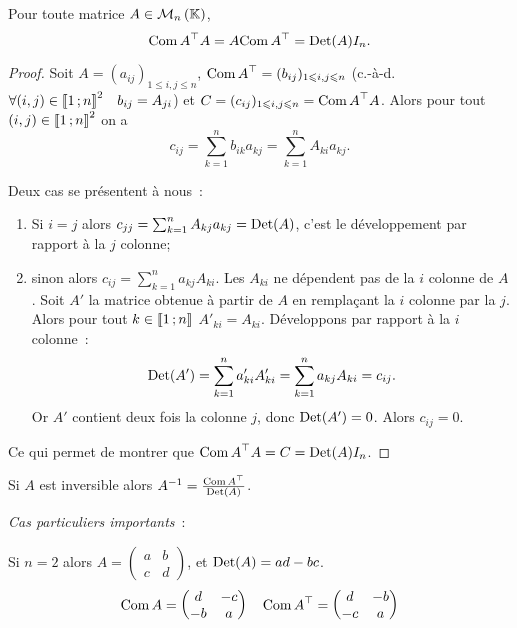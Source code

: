 \begin{prop}
  Pour toute matrice \(A \in \mathcal{M}_{n}\left(\mathbb{K}\right)\),
  \begin{equation}
    {\operatorname{Com}A}^{\top} A = A {\operatorname{Com} A}^{\top} = \operatorname{Det}(A) I_n.
  \end{equation}
\end{prop}
\begin{proof}
  Soit \(A=(a_{ij})_{1 \leqslant i,j \leqslant n}\), \({\operatorname{Com} A}^{\top} = (b_{ij})_{1 \leqslant i,j \leqslant n}\) (c.-à-d. \(\forall (i,j) \in \mathopen{\llbracket}1\mathclose{}\mathpunct{};n\mathclose{\rrbracket}^2 \quad b_{ij}=A_{ji}\)) et \(C=(c_{ij})_{1 \leqslant i,j \leqslant n}={\operatorname{Com} A}^{\top} A\). Alors pour tout \((i,j) \in \mathopen{\llbracket}1\mathclose{}\mathpunct{};n\mathclose{\rrbracket}^2\) on a
  \begin{equation}
    c_{ij} = \sum_{k=1}^n b_{ik}a_{kj} = \sum_{k=1}^n A_{ki} a_{kj}.
  \end{equation}

Deux cas se présentent à nous~:
\begin{enumerate}
\item Si \(i=j\) alors \(c_{jj} = \sum_{k=1}^n A_{kj} a_{kj} = \operatorname{Det}(A)\), c'est le développement par rapport à la \(j\)\ieme{} colonne;
\item sinon alors \(c_{ij} = \sum_{k=1}^n a_{kj} A_{ki}\). Les \(A_{ki}\) ne dépendent pas de la \(i\)\ieme{} colonne de \(A\). Soit \(A'\) la matrice obtenue à partir de \(A\) en remplaçant la \(i\)\ieme{} colonne par la \(j\)\ieme{}. Alors pour tout \(k \in \mathopen{\llbracket}1\mathclose{}\mathpunct{};n\mathclose{\rrbracket}\) \(A'_{ki}=A_{ki}\). Développons par rapport à la \(i\)\ieme{} colonne~:
  \begin{equation}
    \operatorname{Det}(A') = \sum_{k=1}^n a'_{ki} A'_{ki} = \sum_{k=1}^n a_{kj} A_{ki} =c_{ij}.
  \end{equation}
  Or \(A'\) contient deux fois la colonne \(j\), donc \(\operatorname{Det}(A')=0\). Alors \(c_{ij}=0\).
\end{enumerate}

Ce qui permet de montrer que \({\operatorname{Com} A}^{\top} A = C = \operatorname{Det}(A) I_n\).
\end{proof}
\begin{corth}
  Si \(A\) est inversible alors \(A^{-1} = \frac{{\operatorname{Com} A}^{\top}}{\operatorname{Det}(A)}\).
\end{corth}

\emph{Cas particuliers importants}~:

Si \(n=2\) alors \(A=\begin{pmatrix} a & b \\ c & d \end{pmatrix}\), et \(\operatorname{Det}(A)=ad-bc\).
\begin{equation}
  \operatorname{Com} A = \begin{pmatrix} d & -c \\ -b & a \end{pmatrix} \quad   {\operatorname{Com}A}^{\top} = \begin{pmatrix} d & -b \\ -c & a \end{pmatrix}
\end{equation}

